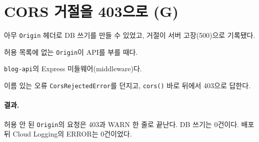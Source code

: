 \section{CORS 거절을 403으로 (G)}\label{sec:05-cors}

\begin{inbrief}
  \item[Why] 아무 \texttt{Origin} 헤더로 DB 쓰기를 만들 수 있었고, 거절이 서버 고장(500)으로 기록됐다.
  \item[When] 허용 목록에 없는 \texttt{Origin}이 API를 부를 때다.
  \item[Where] \texttt{blog-api}의 Express 미들웨어(middleware)다.
  \item[How] 이름 있는 오류 \texttt{CorsRejectedError}를 던지고, \texttt{cors()} 바로 뒤에서 403으로 답한다.
\end{inbrief}

\paragraph{결과.}
허용 안 된 \texttt{Origin}의 요청은 403과 WARN 한 줄로 끝난다.
DB 쓰기는 0건이다.
배포 뒤 Cloud Logging의 ERROR는 0건이었다.

